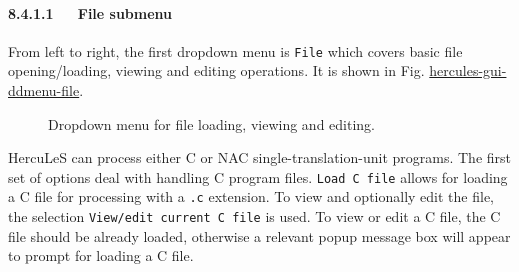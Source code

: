 \documentclass[a4paper]{article}
\begin{document}
\paragraph{8.4.1.1~~~File submenu%
  \label{file-submenu}%
}

From left to right, the first dropdown menu is \texttt{File} which covers basic file opening/loading, viewing and editing operations. It is shown in Fig. \hyperref[hercules-gui-ddmenu-file]{hercules-gui-ddmenu-file}.
\begin{figure}
\label{hercules-gui-ddmenu-file}
\noindent{}
\caption{Dropdown menu for file loading, viewing and editing.}
\end{figure}

HercuLeS can process either C or NAC single-translation-unit programs. The first set of options deal with handling C program files. \texttt{Load C file} allows for loading a C file for processing with a \texttt{.c} extension. To view and optionally edit the file, the selection \texttt{View/edit current C file} is used. To view or edit a C file, the C file should be already loaded, otherwise a relevant popup message box will appear to prompt for loading a C file.
\end{document}
